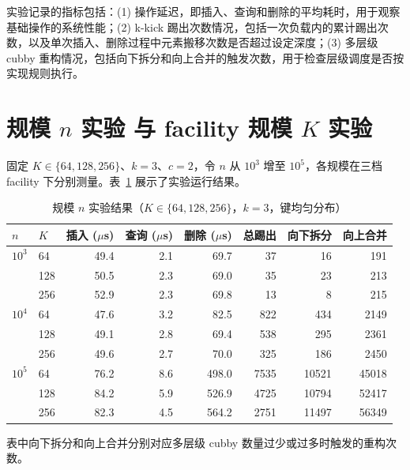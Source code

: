 实验记录的指标包括：(1) 操作延迟，即插入、查询和删除的平均耗时，用于观察基础操作的系统性能；(2) k-kick 踢出次数情况，包括一次负载内的累计踢出次数，以及单次插入、删除过程中元素搬移次数是否超过设定深度；(3) 多层级 cubby 重构情况，包括向下拆分和向上合并的触发次数，用于检查层级调度是否按实现规则执行。

\section{规模 \texorpdfstring{$n$}{n} 实验 与 facility 规模 \texorpdfstring{$K$}{K} 实验}

固定 \(K\in\{64,128,256\}\)、\(k=3\)、\(c=2\)，令 \(n\) 从 \(10^3\) 增至 \(10^5\)，各规模在三档 facility 下分别测量。表~\ref{tab:exp-n-fixed} 展示了实验运行结果。

\begin{table}[htbp]
  \centering
  \caption{规模 \(n\) 实验结果（\(K\in\{64,128,256\}\)，\(k=3\)，键均匀分布）}
  \label{tab:exp-n-fixed}
  \footnotesize
  \begin{tabular}{llrrrrrr}
    \toprule
    $n$ & $K$ &
    插入 ($\mu$s) & 查询 ($\mu$s) & 删除 ($\mu$s) &
    总踢出 & 向下拆分 & 向上合并 \\
    \midrule
    $10^3$ & 64   & 49.4 & 2.1 & 69.7 & 37   & 16    & 191   \\
           & 128  & 50.5 & 2.3 & 69.0 & 35   & 23    & 213   \\
           & 256  & 52.9 & 2.3 & 69.8 & 13   & 8     & 215   \\
    \midrule
    $10^4$ & 64   & 47.6 & 3.2 & 82.5 & 822  & 434   & 2149  \\
           & 128  & 49.1 & 2.8 & 69.4 & 538  & 295   & 2361  \\
           & 256  & 49.6 & 2.7 & 70.0 & 325  & 186   & 2450  \\
    \midrule
    $10^5$ & 64   & 76.2 & 8.6 & 498.0 & 7535  & 10521 & 45018 \\
           & 128  & 84.2 & 5.9 & 526.9 & 4725  & 10794 & 52417 \\
           & 256  & 82.3 & 4.5 & 564.2 & 2751  & 11497 & 56349 \\
    \bottomrule
  \end{tabular}
\end{table}

\noindent 表中向下拆分和向上合并分别对应多层级 cubby 数量过少或过多时触发的重构次数。


